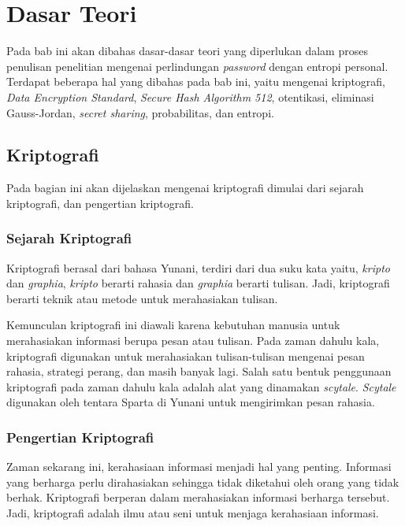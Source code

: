 \chapter{Dasar Teori}
\label{chap:dasar teori}

Pada bab ini akan dibahas dasar-dasar teori yang diperlukan dalam proses penulisan penelitian mengenai perlindungan \textit{password} dengan entropi personal. Terdapat beberapa hal yang dibahas pada bab ini, yaitu mengenai kriptografi, \textit{Data Encryption Standard}, \textit{Secure Hash Algorithm 512}, otentikasi, eliminasi Gauss-Jordan, \textit{secret sharing}, probabilitas, dan entropi.

\section{Kriptografi}

Pada bagian ini akan dijelaskan mengenai kriptografi dimulai dari sejarah kriptografi, dan pengertian kriptografi.

\subsection{Sejarah Kriptografi}

Kriptografi berasal dari bahasa Yunani, terdiri dari dua suku kata yaitu, \textit{kripto} dan \textit{graphia}, \textit{kripto} berarti rahasia dan \textit{graphia} berarti tulisan. Jadi, kriptografi berarti teknik atau metode untuk merahasiakan tulisan.

Kemunculan kriptografi ini diawali karena kebutuhan manusia untuk merahasiakan informasi berupa pesan atau tulisan. Pada zaman dahulu kala, kriptografi digunakan untuk merahasiakan tulisan-tulisan mengenai pesan rahasia, strategi perang, dan masih banyak lagi. Salah satu bentuk penggunaan kriptografi pada zaman dahulu kala adalah alat yang dinamakan \textit{scytale}. \textit{Scytale} digunakan oleh tentara Sparta di Yunani untuk mengirimkan pesan rahasia\cite{munir2010matematikadiskrit}.

\subsection{Pengertian Kriptografi}

Zaman sekarang ini, kerahasiaan informasi menjadi hal yang penting. Informasi yang berharga perlu dirahasiakan sehingga tidak diketahui oleh orang yang tidak berhak. Kriptografi berperan dalam merahasiakan informasi berharga tersebut. Jadi, kriptografi adalah ilmu atau seni untuk menjaga kerahasiaan informasi.

